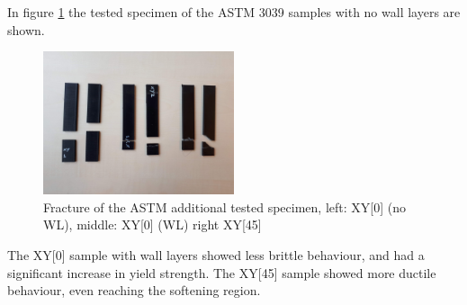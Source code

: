 In figure \ref{fig:ASTM3039addspecimen} the tested specimen of the ASTM 3039 samples with no wall layers are shown.
\begin{figure}[H]
    \centering
    \includegraphics[width=0.50\textwidth]{chapter_5_Experimentaltesting/figures/imageASTMadd.jpg}
    \caption{Fracture of the ASTM additional tested specimen, left: XY[0] (no WL), middle: XY[0] (WL) right XY[45]}
    \label{fig:ASTM3039addspecimen}
\end{figure}
The XY[0] sample with wall layers showed less brittle behaviour, and had a significant increase in yield strength. The XY[45] sample showed  more ductile behaviour, even reaching the softening region.



